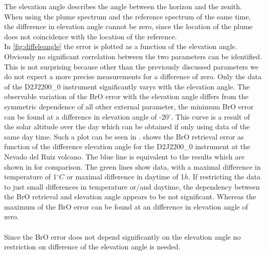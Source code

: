 The elevation angle describes the angle between the horizon and the zenith. When using the plume spectrum and the reference spectrum of the same time, the difference in elevation angle cannot be zero, since the location of the plume does not coincidence with the location of the reference.\\
In \cref{fig:diffeleangle} the  error is plotted as a function of the elevation angle. Obviously no significant correlation between the two parameters can be identified. This is not surprising because other than the previously discussed parameters we do not expect a more precise measurements for a difference of zero. 
Only the data of the D2J2200\_0 instrument significantly varys with the elevation angle. The observable variation of the BrO error with the elevation angle differs from the symmetric dependence of all other external parameter, the minimum BrO error can be found at a difference in elevation angle of -20$^{\circ}$. This curve is a result of the solar altitude over the day which can be obtained if only using data of the same day time. Such a plot can be seen in .
 shows the BrO retrieval error as function of the difference elevation angle for the D2J2200\_0 instrument at the Nevado del Ruiz volcano. The blue line is equivalent to the results which are shown in  for comparison. The green lines show data, with a maximal difference in temperature of 1$^{\circ}C$ or maximal difference in daytime of 1$h$. If restricting the data to just small differences in temperature or/and daytime, the dependency between the BrO retrieval and elevation angle appears to be not significant. Whereas the maximum of the BrO error can be found at an difference in elevation angle of zero.\\
\\	
Since the BrO error does not depend significantly on the elevation angle no restriction on difference of the elevation angle is needed.
